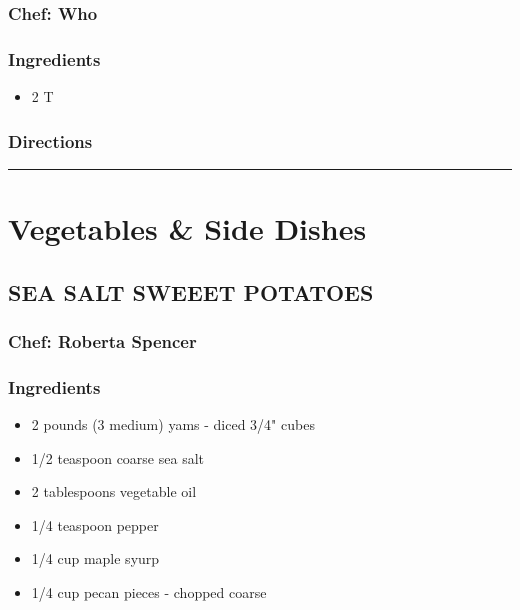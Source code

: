 \documentclass[
]{book}
\providecommand{\tightlist}{%
  \setlength{\itemsep}{0pt}\setlength{\parskip}{0pt}}
\begin{document}
\hypertarget{chef-who}{%
\subsection*{Chef: Who}\label{chef-who}}


\hypertarget{ingredients-25}{%
\subsection*{Ingredients}\label{ingredients-25}}


\begin{itemize}
\tightlist
\item
  2 T
\end{itemize}

\hypertarget{directions-25}{%
\subsection*{Directions}\label{directions-25}}


\begin{center}\rule{0.5\linewidth}{0.5pt}\end{center}

\hypertarget{Sides}{%
\chapter{Vegetables \& Side Dishes}\label{Sides}}

\hypertarget{sea-salt-sweeet-potatoes}{%
\section*{SEA SALT SWEEET POTATOES}\label{sea-salt-sweeet-potatoes}}


\hypertarget{chef-roberta-spencer-5}{%
\subsection*{Chef: Roberta Spencer}\label{chef-roberta-spencer-5}}


\hypertarget{ingredients-26}{%
\subsection*{Ingredients}\label{ingredients-26}}


\begin{itemize}
\tightlist
\item
  2 pounds (3 medium) yams - diced 3/4" cubes
\item
  1/2 teaspoon coarse sea salt
\item
  2 tablespoons vegetable oil
\item
  1/4 teaspoon pepper
\item
  1/4 cup maple syurp
\item
  1/4 cup pecan pieces - chopped coarse
\end{itemize}
\end{document}
